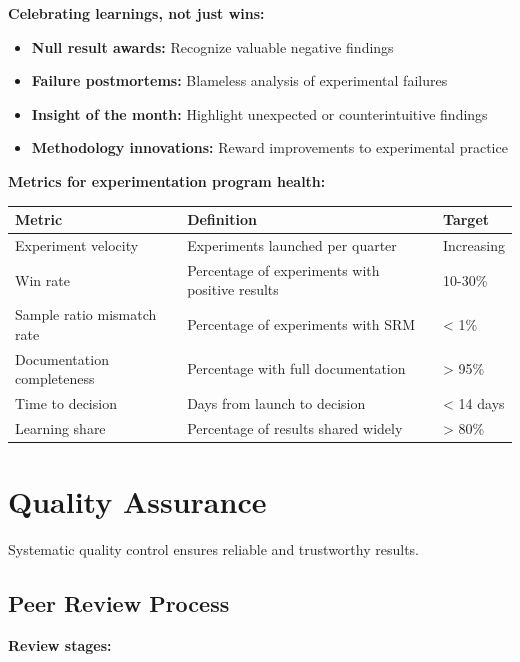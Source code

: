\textbf{Celebrating learnings, not just wins:}

\begin{itemize}
    \item \textbf{Null result awards:} Recognize valuable negative findings
    \item \textbf{Failure postmortems:} Blameless analysis of experimental failures
    \item \textbf{Insight of the month:} Highlight unexpected or counterintuitive findings
    \item \textbf{Methodology innovations:} Reward improvements to experimental practice
\end{itemize}

\textbf{Metrics for experimentation program health:}

\begin{center}
\begin{tabular}{lp{6cm}p{3cm}}
\toprule
\textbf{Metric} & \textbf{Definition} & \textbf{Target} \\
\midrule
Experiment velocity & Experiments launched per quarter & Increasing \\
Win rate & Percentage of experiments with positive results & 10-30\% \\
Sample ratio mismatch rate & Percentage of experiments with SRM & < 1\% \\
Documentation completeness & Percentage with full documentation & > 95\% \\
Time to decision & Days from launch to decision & < 14 days \\
Learning share & Percentage of results shared widely & > 80\% \\
\bottomrule
\end{tabular}
\end{center}

\section{Quality Assurance}

Systematic quality control ensures reliable and trustworthy results.

\subsection{Peer Review Process}

\textbf{Review stages:}

